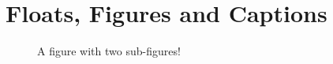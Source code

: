 \section{Floats, Figures and Captions} %
\label{sec:floats_figures_and_captions}

% 
% 
% 
% 



\lipsum[1-3]

\begin{figure}[htbp]
  \centering
  \caption{A figure with two sub-figures!}
  \label{fig:fig2subfig}
\end{figure}

